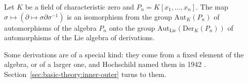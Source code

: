 \begin{theorem}\label{thm:basic:bavula}
Let $K$ be a field of characteristic zero and $P_n = K[x_1,\dots,x_n]$. The map
$\sigma \mapsto (\partial \mapsto \sigma\partial\sigma^{-1})$ is an
isomorphism from the group $\mathrm{Aut}_K(P_n)$ of automorphisms of the
algebra $P_n$ onto the group $\mathrm{Aut}_{\mathrm{Lie}}(\mathrm{Der}_K(P_n))$
of automorphisms of the Lie algebra of derivations.
\end{theorem}

Some derivations are of a special kind: they come from a fixed element of the algebra, or of a larger one, and Hochschild named them in 1942 \cite[Definition~3.2, p.~689]{Hochschild1942}. Section~\ref{sec:basic-theory:inner-outer} turns to them.
